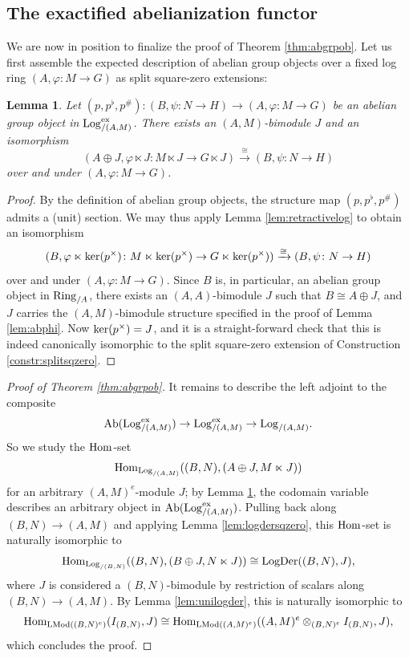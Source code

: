 \documentclass[a4paper,10pt%
]{amsart}
\numberwithin{equation}{section}
\newtheorem{lemma}[subsection]{Lemma}
\theoremstyle{definition}
\renewcommand{\:}{\colon}
\begin{document}
\subsection{The exactified abelianization functor} We are now in position to finalize the proof of Theorem \ref{thm:abgrpob}. Let us first assemble the expected description of abelian group objects over a fixed log ring $(A, \varphi \colon M \to G)$ as split square-zero extensions: 

\begin{lemma}\label{lem:abgrpsplit} Let $(p, p^\flat, p^\#) \colon (B, \psi \colon N \to H) \to (A, \varphi \colon M \to G)$ be an abelian group object in ${\rm Log}^{\rm ex}_{/(A, M)}$. There exists an $(A, M)$-bimodule $J$ and an isomorphism \[(A \oplus J, \varphi \ltimes J \colon M \ltimes J \to G \ltimes J) \xrightarrow{\cong} (B, \psi \colon N \to H)\] over and under $(A, \varphi \colon M \to G)$. 
\end{lemma}

\begin{proof} By the definition of abelian group objects, the structure map $(p, p^\flat, p^\#)$ admits a (unit) section. We may thus apply Lemma \ref{lem:retractivelog} to obtain an isomorphism \[(B, \varphi \ltimes {\rm ker}(p^\times) \colon M \ltimes {\rm ker}(p^\times) \to G \ltimes {\rm ker}(p^\times)) \xrightarrow{\cong} (B, \psi \colon N \to H)\] over and under $(A, \varphi \colon M \to G)$. Since $B$ is, in particular, an abelian group object in ${\rm Ring}_{/A}$, there exists an $(A, A)$-bimodule $J$ such that $B \cong A \oplus J$, and $J$ carries the $(A, M)$-bimodule structure specified in the proof of Lemma \ref{lem:abphi}. Now ${\rm ker}(p^\times) = J$, and it is a straight-forward check that this is indeed canonically isomorphic to the split square-zero extension of Construction \ref{constr:splitsqzero}.   
\end{proof}

\begin{proof}[Proof of Theorem \ref{thm:abgrpob}] It remains to describe the left adjoint to the composite \[{\rm Ab}({\rm Log}^{\rm ex}_{/(A, M)}) \to {\rm Log}^{\rm ex}_{/(A, M)} \to {\rm Log}_{/(A, M)}.\] So we study the ${\rm Hom}$-set \[{\rm Hom}_{{\rm Log}_{/(A, M)}}((B, N), (A \oplus J, M \ltimes J))\] for an arbitrary $(A, M)^e$-module $J$; by Lemma \ref{lem:abgrpsplit}, the codomain variable describes an arbitrary object in ${\rm Ab}({\rm Log}^{\rm ex}_{/(A, M)})$. Pulling back along $(B, N) \to (A, M)$ and applying Lemma \ref{lem:logdersqzero}, this ${\rm Hom}$-set is naturally isomorphic to \[{\rm Hom}_{{\rm Log}_{/(B, N)}}((B, N), (B \oplus J, N \ltimes J)) \cong {\rm LogDer}((B, N), J),\] where $J$ is considered a $(B, N)$-bimodule by restriction of scalars along $(B, N) \to (A, M)$. By Lemma \ref{lem:unilogder}, this is naturally isomorphic to \[{\rm Hom}_{{\rm LMod}((B, N)^e)}(I_{(B, N)}, J) \cong {\rm Hom}_{{\rm LMod}((A, M)^e)}((A, M)^e \otimes_{(B, N)^e} I_{(B, N)}, J),\] which concludes the proof. 
\end{proof}
\end{document}
